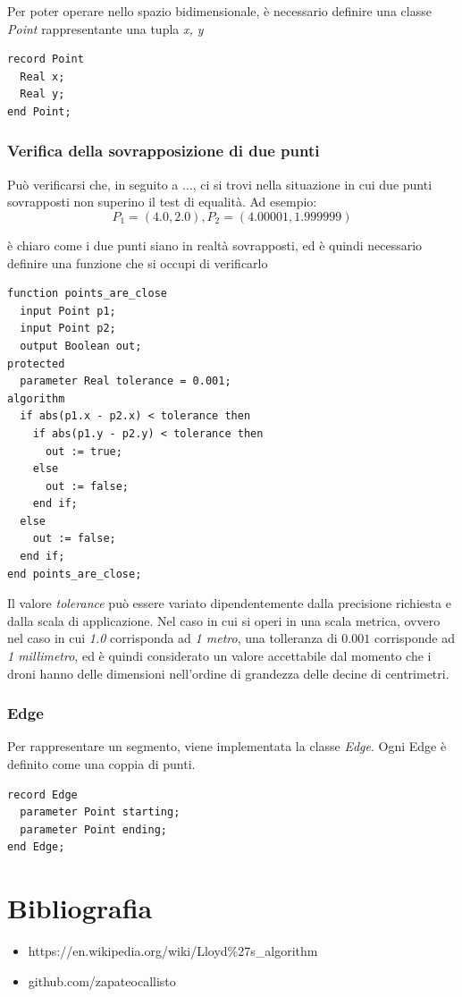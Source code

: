 \documentclass[10pt,a4paper]{article}
\begin{document}
Per poter operare nello spazio bidimensionale, è necessario definire una classe \textit{Point} rappresentante una tupla \textit{x, y}

\begin{lstlisting}[language=Modelica]
record Point
  Real x;
  Real y;
end Point;
\end{lstlisting}

\subsubsection{Verifica della sovrapposizione di due punti}

Può verificarsi che, in seguito a ..., ci si trovi nella situazione in cui due punti sovrapposti non superino il test di equalità. Ad esempio:
\[
P_1 = (4.0, 2.0),
P_2 = (4.00001, 1.999999)
\]

è chiaro come i due punti siano in realtà sovrapposti, ed è quindi necessario definire una funzione che si occupi di verificarlo

\begin{lstlisting}[language=Modelica]
function points_are_close
  input Point p1;
  input Point p2;
  output Boolean out;
protected
  parameter Real tolerance = 0.001;
algorithm
  if abs(p1.x - p2.x) < tolerance then
    if abs(p1.y - p2.y) < tolerance then
      out := true;
    else
      out := false;
    end if;
  else
    out := false;
  end if;
end points_are_close;
\end{lstlisting}

Il valore \textit{tolerance} può essere variato dipendentemente dalla precisione richiesta e dalla scala di applicazione. Nel caso in cui si operi in una scala metrica, ovvero nel caso in cui \textit{1.0} corrisponda ad \textit{1 metro}, una tolleranza di $0.001$ corrisponde ad \textit{1 millimetro}, ed è quindi considerato un valore accettabile dal momento che i droni hanno delle dimensioni nell'ordine di grandezza delle decine di centrimetri.

\subsubsection{Edge}

Per rappresentare un segmento, viene implementata la classe \textit{Edge}. Ogni Edge è definito come una coppia di punti.

\begin{lstlisting}[language=Modelica]
record Edge
  parameter Point starting;
  parameter Point ending;
end Edge;
\end{lstlisting}

\section*{Bibliografia}

\begin{itemize}
	\item https://en.wikipedia.org/wiki/Lloyd\%27s\_algorithm
	\item github.com/zapateocallisto
\end{itemize}
\end{document}
